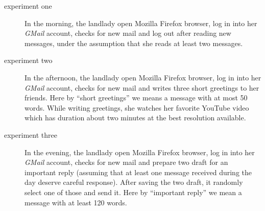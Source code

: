 \documentclass[10pt,a4paper]{article}
\begin{document}
    \begin{description}
    \item[experiment one] In the morning, the landlady open Mozilla
      Firefox browser, log in into her \emph{GMail} account, checks for
      new mail and log out after reading new messages, under the
      assumption that she reads at least two messages.
    \item[experiment two] In the afternoon, the landlady open Mozilla
      Firefox browser, log in into her \emph{GMail} account, checks for
      new mail and writes three short greetings to her friends. Here
      by ``short greetings'' we means a message with at most 50 words.
      While writing greetings, she watches her favorite YouTube video
      which has duration about two minutes at the best resolution
      available.
    \item[experiment three] In the evening, the landlady open Mozilla
      Firefox browser, log in into her \emph{GMail} account, checks for
      new mail and prepare two draft for an important reply (assuming
      that at least one message received during the day deserve
      careful response). After saving the two draft, it randomly
      select one of those and send it. Here by ``important reply'' we
      mean a message with at least 120 words.
    \end{description}
\end{document}
